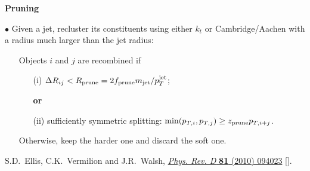 \documentclass[9pt,a4paper,unknownkeysallowed,xcolor=dvipsnames,aspectratio=43]{beamer}
\begin{document}
%
%
\begin{frame}{\bf \huge Pruning}\vspace{2mm}

{\color{darkred}\Large$\bullet$} Given a jet, recluster its constituents
using either $k_t$ or Cambridge/Aachen with a radius
much larger than the jet radius:\vspace{4mm}

\begin{enumerate}
    \item[\diamondsuit] Objects $i$ and $j$ are recombined if 
\vspace{4mm}
\begin{enumerate}
    \item[(i)] $\Delta R_{ij} < R_{\rm prune}=2 f_{\rm prune} m_{\rm jet}/p_{T}^{\rm jet}$;\\\vspace{2mm}
\begin{center}
    {\bf or}
\end{center}
\vspace{4mm}
\item[(ii)] sufficiently symmetric splitting:
${\rm min}(p_{T,i},p_{T,j})\ge z_{\rm prune}p_{T,i+j}$.
\end{enumerate}\vspace{8mm}
\item[\diamondsuit] Otherwise, keep the harder one and discard the soft one.
\end{enumerate}
\vspace{4mm}
\begin{center}
    {\tiny \color{teablue}S.D.~Ellis, C.K.~Vermilion and J.R.~Walsh, %
  \href{https://doi.org/10.1103/PhysRevD.81.094023}{\emph{Phys. Rev. D}
  {\bfseries 81} (2010) 094023}
  [\href{https://arxiv.org/abs/0912.0033}{{}}].
}
\end{center}
\end{frame}
%
%
\end{document}
